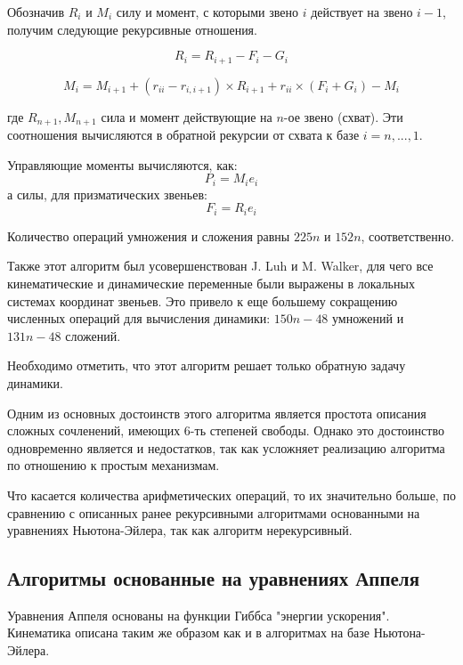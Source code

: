 Обозначив $R_i$ и $M_i$ силу и момент, с которыми звено $i$ действует на звено $i-1$, получим следующие рекурсивные отношения.

\begin{equation}
R_i = R_{i+1} - F_i - G_i
\end{equation}

\begin{equation}
M_i = M_{i+1} + (r_{ii} - r_{i,i+1}) \times R_{i+1} + r_{ii} \times (F_i + G_i) - M_i
\end{equation}

где $R_{n+1}, M_{n+1}$ сила и момент действующие на $n$-ое звено (схват). Эти соотношения вычисляются в обратной рекурсии от схвата к базе $i = n,...,1$. 

Управляющие моменты вычисляются, как:
\begin{equation}
P_i = M_i e_i
\end{equation}
а силы, для призматических звеньев:
\begin{equation}
F_i = R_i e_i
\end{equation}

Количество операций умножения и сложения равны $225n$ и $152n$, соответственно.

Также этот алгоритм был усовершенствован J. Luh и M. Walker, для чего все кинематические и динамические переменные были выражены в локальных системах координат звеньев. Это привело к еще большему сокращению численных операций для вычисления динамики: $150n - 48$ умножений и $131n - 48$ сложений.

Необходимо отметить, что этот алгоритм решает только обратную задачу динамики.

Одним из основных достоинств этого алгоритма является простота описания сложных сочленений, имеющих 6-ть степеней свободы. Однако это достоинство одновременно является и недостатков, так как усложняет реализацию алгоритма по отношению к простым механизмам. 

Что касается количества арифметических операций, то их значительно больше, по сравнению с описанных ранее рекурсивными алгоритмами основанными на уравнениях Ньютона-Эйлера, так как алгоритм нерекурсивный.

\subsection{Алгоритмы основанные на уравнениях Аппеля}
Уравнения Аппеля основаны на функции Гиббса "энергии ускорения". Кинематика описана таким же образом как и в алгоритмах на базе Ньютона-Эйлера.


